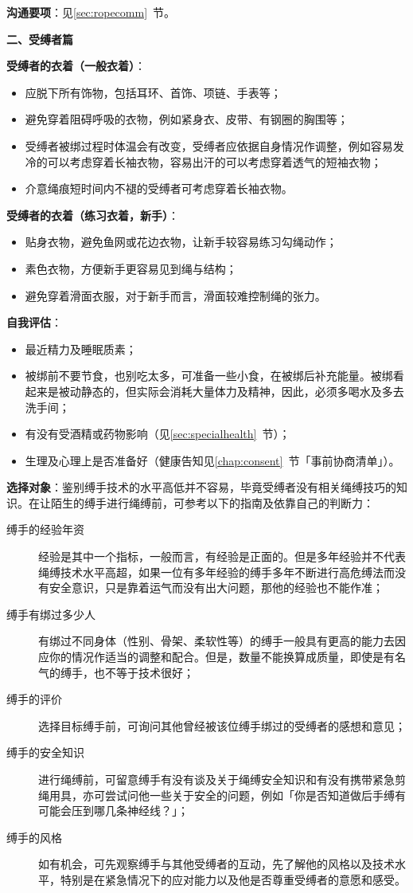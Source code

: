 \documentclass[12pt,UTF8]{ctexbook}
\begin{document}
\textbf{沟通要项}：见\ref{sec:ropecomm}~节。

\noindent\textbf{二、受缚者篇}

\textbf{受缚者的衣着（一般衣着）}：
\begin{itemize}
\item 应脱下所有饰物，包括耳环、首饰、项链、手表等；
\item 避免穿着阻碍呼吸的衣物，例如紧身衣、皮带、有钢圈的胸围等；
\item 受缚者被绑过程时体温会有改变，受缚者应依据自身情况作调整，例如容易发冷的可以考虑穿着长袖衣物，容易出汗的可以考虑穿着透气的短袖衣物；
\item 介意绳痕短时间内不褪的受缚者可考虑穿着长袖衣物。
\end{itemize}

\textbf{受缚者的衣着（练习衣着，新手）}：
\begin{itemize}
\item 贴身衣物，避免鱼网或花边衣物，让新手较容易练习勾绳动作；
\item 素色衣物，方便新手更容易见到绳与结构；
\item 避免穿着滑面衣服，对于新手而言，滑面较难控制绳的张力。
\end{itemize}

\textbf{自我评估}：
\begin{itemize}
\item 最近精力及睡眠质素；
\item 被绑前不要节食，也别吃太多，可准备一些小食，在被绑后补充能量。被绑看起来是被动静态的，但实际会消耗大量体力及精神，因此，必须多喝水及多去洗手间；
\item 有没有受酒精或药物影响（见\ref{sec:specialhealth}~节）；
\item 生理及心理上是否准备好（健康告知见\ref{chap:consent}~节「事前协商清单」）。
\end{itemize}

\textbf{选择对象}：鉴别缚手技术的水平高低并不容易，毕竟受缚者没有相关绳缚技巧的知识。在让陌生的缚手进行绳缚前，可参考以下的指南及依靠自己的判断力：
\begin{description}
\item[缚手的经验年资] 经验是其中一个指标，一般而言，有经验是正面的。但是多年经验并不代表绳缚技术水平高超，如果一位有多年经验的缚手多年不断进行高危缚法而没有安全意识，只是靠着运气而没有出大问题，那他的经验也不能作准；
\item[缚手有绑过多少人] 有绑过不同身体（性别、骨架、柔软性等）的缚手一般具有更高的能力去因应你的情况作适当的调整和配合。但是，数量不能换算成质量，即使是有名气的缚手，也不等于技术很好；
\item[缚手的评价] 选择目标缚手前，可询问其他曾经被该位缚手绑过的受缚者的感想和意见；
\item[缚手的安全知识] 进行绳缚前，可留意缚手有没有谈及关于绳缚安全知识和有没有携带紧急剪绳用具，亦可尝试问他一些关于安全的问题，例如「你是否知道做后手缚有可能会压到哪几条神经线？」；
\item[缚手的风格] 如有机会，可先观察缚手与其他受缚者的互动，先了解他的风格以及技术水平，特别是在紧急情况下的应对能力以及他是否尊重受缚者的意愿和感受。
\end{description}
\end{document}
